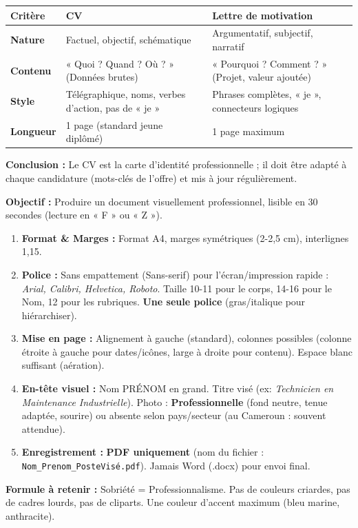 \documentclass[11pt]{article}
\newcommand{\cle}[1]{{\popxbold\color{popdark}#1}}
\newcounter{popsec}
\newcounter{popsub}
\newcommand{\courssub}[1]{%
  \stepcounter{popsub}%
  \par\vspace{9pt}\noindent{\popxbold\fontsize{11.5}{13}\selectfont\color{popink}{\color{poporange}\thepopsec.\thepopsub}\hspace{6pt}#1}\par\nopagebreak\vspace{4pt}
}
\begin{document}
\begin{exoresolu}
\begin{center}
\begin{tabularx}{\linewidth}{|l|X|X|}\hline
\textbf{Critère} & \textbf{CV} & \textbf{Lettre de motivation} \\ \hline
\textbf{Nature} & Factuel, objectif, schématique & Argumentatif, subjectif, narratif \\ \hline
\textbf{Contenu} & « Quoi ? Quand ? Où ? » (Données brutes) & « Pourquoi ? Comment ? » (Projet, valeur ajoutée) \\ \hline
\textbf{Style} & Télégraphique, noms, verbes d'action, pas de « je » & Phrases complètes, « je », connecteurs logiques \\ \hline
\textbf{Longueur} & 1 page (standard jeune diplômé) & 1 page maximum \\ \hline
\end{tabularx}
\end{center}

\textbf{Conclusion :} Le CV est la \cle{carte d'identité professionnelle} ; il doit être adapté à chaque candidature (mots-clés de l'offre) et mis à jour régulièrement.
\end{exoresolu}

\courssub{La structure externe du CV}

\begin{methode}
    \textbf{Objectif :} Produire un document visuellement professionnel, lisible en 30 secondes (lecture en « F » ou « Z »).
    \begin{enumerate}
        \item \textbf{Format \& Marges :} Format A4, marges symétriques (2-2,5 cm), interlignes 1,15.
        \item \textbf{Police :} Sans empattement (Sans-serif) pour l'écran/impression rapide : \emph{Arial, Calibri, Helvetica, Roboto}. Taille 10-11 pour le corps, 14-16 pour le Nom, 12 pour les rubriques. \textbf{Une seule police} (gras/italique pour hiérarchiser).
        \item \textbf{Mise en page :} Alignement à gauche (standard), colonnes possibles (colonne étroite à gauche pour dates/icônes, large à droite pour contenu). Espace blanc suffisant (aération).
        \item \textbf{En-tête visuel :} Nom \textsc{PRÉNOM} en grand. Titre visé (ex: \emph{Technicien en Maintenance Industrielle}). Photo : \textbf{Professionnelle} (fond neutre, tenue adaptée, sourire) ou absente selon pays/secteur (au Cameroun : souvent attendue).
        \item \textbf{Enregistrement :} \textbf{PDF uniquement} (nom du fichier : \texttt{Nom\_Prenom\_PosteVisé.pdf}). Jamais Word (.docx) pour envoi final.
    \end{enumerate}
    \textbf{Formule à retenir :} \cle{Sobriété = Professionnalisme}. Pas de couleurs criardes, pas de cadres lourds, pas de cliparts. Une couleur d'accent maximum (bleu marine, anthracite).
\end{methode}
\end{document}
